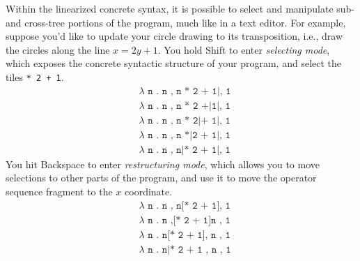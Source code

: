 Within the linearized concrete syntax, it is possible to
select and manipulate sub- and cross-tree portions of the program,
much like in a text editor. For example, suppose you'd like
to update your circle drawing to its transposition,
i.e., draw the circles along the line $x = 2y + 1$.
You hold Shift to enter \emph{selecting mode}, which exposes
the concrete syntactic structure of your program, and select
the tiles \texttt{* 2 + 1}.
\begin{align*}
  & \texttt{$\lambda$ n . n , n * 2 + 1|, 1} \\
  & \texttt{$\lambda$ n . n , n * 2 +|1|, 1} \\
  & \texttt{$\lambda$ n . n , n * 2|+ 1|, 1} \\
  & \texttt{$\lambda$ n . n , n *|2 + 1|, 1} \\
  & \texttt{$\lambda$ n . n , n|* 2 + 1|, 1}
\end{align*}
You hit Backspace to enter \emph{restructuring mode}, which
allows you to move selections to other parts of the program,
and use it to move the operator sequence fragment to the
$x$ coordinate.
\begin{align*}
  & \texttt{$\lambda$ n . n , n[* 2 + 1], 1} \\
  & \texttt{$\lambda$ n . n ,[* 2 + 1]n , 1} \\
  & \texttt{$\lambda$ n . n[* 2 + 1], n , 1} \\
  & \texttt{$\lambda$ n . n|* 2 + 1 , n , 1}
\end{align*}

